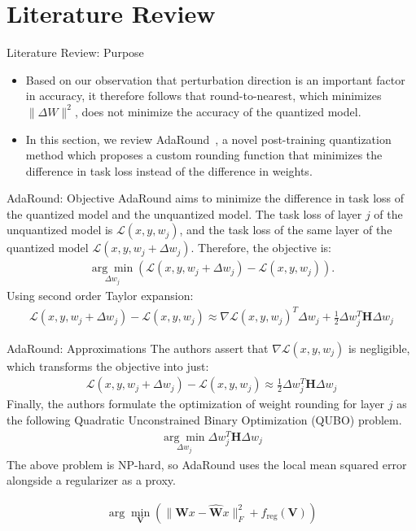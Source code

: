\documentclass{beamer}
\begin{document}
\section{Literature Review}
\begin{frame}{Literature Review: Purpose}
  \begin{itemize}
    \item Based on our observation that perturbation direction is an important factor in accuracy, it therefore follows that round-to-nearest, which minimizes $\lVert \Delta W \rVert^2$, does not minimize the accuracy of the quantized model.
    \item In this section, we review AdaRound~\cite{nagelAdaptiveRoundingPostTraining2020a}, a novel post-training quantization method which proposes a custom rounding function that minimizes the difference in task loss instead of the difference in weights.
  \end{itemize}
\end{frame}
\begin{frame}{AdaRound: Objective}
AdaRound aims to minimize the difference in task loss of the quantized model and the unquantized model. The task loss of layer $j$ of the unquantized model is $\mathcal{L}(x, y, w_j)$, and the task loss of the same layer of the quantized model $\mathcal{L}(x, y, w_j + \Delta w_j)$. Therefore, the objective is:
\begin{align}
\underset{\Delta w_j}{\arg\min} \left(\mathcal{L}(x, y, w_j + \Delta w_j) - \mathcal{L}(x, y, w_j)\right).
\end{align}
Using second order Taylor expansion:
\begin{align} \label{eq:adaround_taylor_expansion}
\mathcal{L}(x, y, w_j + \Delta w_j) - \mathcal{L}(x, y, w_j) \approx \nabla\mathcal{L}(x, y, w_j)^T \Delta w_j + \frac{1}{2} \Delta w_j^T \mathbf{H} \Delta w_j
\end{align}
\end{frame}
\begin{frame}{AdaRound: Approximations}
The authors assert that $\nabla\mathcal{L}(x, y, w_j)$ is negligible, which transforms the objective into just:
\begin{align}
\mathcal{L}(x, y, w_j + \Delta w_j) - \mathcal{L}(x, y, w_j) \approx \frac{1}{2} \Delta w_j^T \mathbf{H} \Delta w_j
\end{align}
Finally, the authors formulate the optimization of weight rounding for layer $j$ as the following Quadratic Unconstrained Binary Optimization (QUBO) problem.
\begin{align}
\underset{\Delta w_j}{\arg\min} \Delta w_j^T \mathbf{H} \Delta w_j
\end{align}
The above problem is NP-hard, so AdaRound uses the local mean squared error alongside a regularizer as a proxy. 

\begin{align} \label{eq:adaround_objective}
\arg\min_{\mathbf{V}} \left( \|\mathbf{W}x - \hat{\mathbf{W}}x\|_F^2 + f_\text{reg}(\mathbf{V}) \right)
\end{align}
\end{frame}
\end{document}
